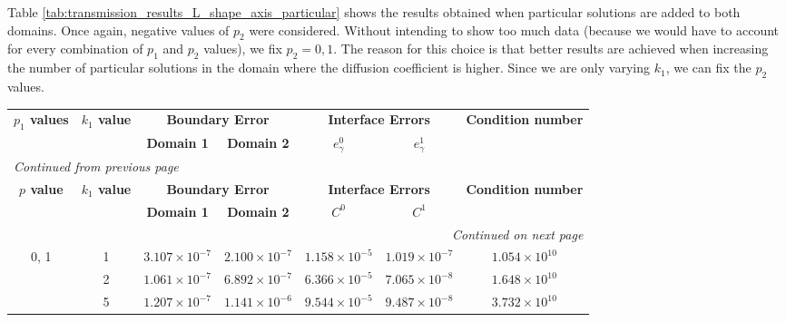 Table \ref{tab:transmission_results_L_shape_axis_particular} shows the results obtained when particular solutions are added to both domains. Once again, negative values of \(p_2\) were considered. Without intending to show too much data (because we would have to account for every combination of \(p_1\) and \(p_2\) values), we fix \(p_2=0, 1\). The reason for this choice is that better results are achieved when increasing the number of particular solutions in the domain where the diffusion coefficient is higher. Since we are only varying \(k_1\), we can fix the \(p_2\) values.
\pagebreak
\begin{table}[!htbp]
    \centering
    \begin{longtable}{ccccccc}
        \toprule
        \multicolumn{1}{c}{\textbf{\(p_1\) values}} & \multicolumn{1}{c}{\textbf{\(k_1\) value}} & \multicolumn{2}{c}{\textbf{Boundary Error}} & \multicolumn{2}{c}{\textbf{Interface Errors}} & \multicolumn{1}{c}{\textbf{Condition number}} \\
        \cmidrule(lr){2-2} \cmidrule(lr){3-4} \cmidrule(lr){5-6} \cmidrule(lr){7-7}
        & & \textbf{Domain 1} & \textbf{Domain 2} & \textbf{\(e_\gamma^0\)} & \textbf{\(e_\gamma^1\)} & \\
        \midrule
        \endfirsthead %
        \multicolumn{7}{l}{{\footnotesize\emph{Continued from previous page}}} \\
        \toprule
        \multicolumn{1}{c}{\textbf{\(p\) value}} & \multicolumn{1}{c}{\textbf{\(k_1\) value}} & \multicolumn{2}{c}{\textbf{Boundary Error}} & \multicolumn{2}{c}{\textbf{Interface Errors}} & \multicolumn{1}{c}{\textbf{Condition number}} \\
        \cmidrule(lr){2-2} \cmidrule(lr){3-4} \cmidrule(lr){5-6} \cmidrule(lr){7-7}
        & & \textbf{Domain 1} & \textbf{Domain 2} & \textbf{\(C^0\)} & \textbf{\(C^1\)} & \\
        \midrule
        \endhead %
        \midrule[\heavyrulewidth] %
        \multicolumn{7}{r}{{\footnotesize\emph{Continued on next page}}} \\
        \endfoot %
        \bottomrule
        \endlastfoot %
        
        0, 1 & 1 & $3.107\times10^{-7}$ & $2.100\times10^{-7}$ & $1.158\times10^{-5}$ & $1.019\times10^{-7}$ & $1.054\times10^{10}$ \\
        & 2 & $1.061\times10^{-7}$ & $6.892\times10^{-7}$ & $6.366\times10^{-5}$ & $7.065\times10^{-8}$ & $1.648\times10^{10}$ \\
        & 5 & $1.207\times10^{-7}$ & $1.141\times10^{-6}$ & $9.544\times10^{-5}$ & $9.487\times10^{-8}$ & $3.732\times10^{10}$ \\
        \midrule[\heavyrulewidth] %
        

\end{longtable}
\end{table}
